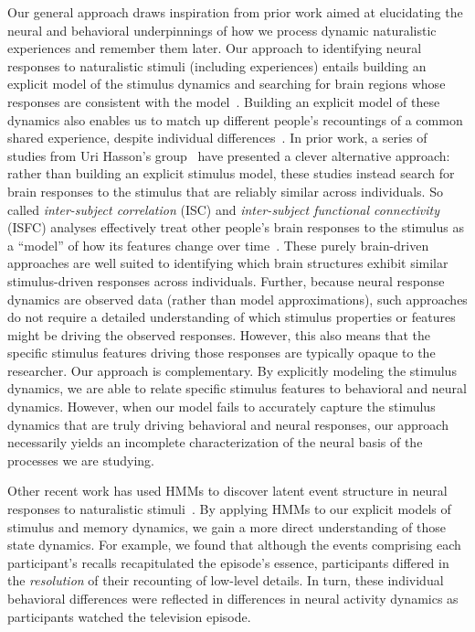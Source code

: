 \documentclass[10pt]{article}
\begin{document}
Our general approach draws inspiration from prior work aimed at elucidating the neural and behavioral underpinnings of how we process dynamic naturalistic experiences and remember them later.  Our approach to identifying neural responses to naturalistic stimuli (including experiences) entails building an explicit model of the stimulus dynamics and searching for brain regions whose responses are consistent with the model~\citep[also see][]{HuthEtal12, HuthEtal16}.  Building an explicit model of these dynamics also enables us to match up different people's recountings of a common shared experience, despite individual differences~\cite[also see][]{GagnEtal20}.  In prior work, a series of studies from Uri Hasson's group~\citep{LernEtal11, SimoEtal16, ChenEtal17, BaldEtal17, ZadbEtal17} have presented a clever alternative approach: rather than building an explicit stimulus model, these studies instead search for brain responses to the stimulus that are reliably similar across individuals.  So called \textit{inter-subject correlation} (ISC) and \textit{inter-subject functional connectivity} (ISFC) analyses effectively treat other people's brain responses to the stimulus as a ``model'' of how its features change over time~\citep[also see][]{SimoChan20}.  These purely brain-driven approaches are well suited to identifying which brain structures exhibit similar stimulus-driven responses across individuals.  Further, because neural response dynamics are observed data (rather than model approximations), such approaches do not require a detailed understanding of which stimulus properties or features might be driving the observed responses.  However, this also means that the specific stimulus features driving those responses are typically opaque to the researcher.  Our approach is complementary.  By explicitly modeling the stimulus dynamics, we are able to relate specific stimulus features to behavioral and neural dynamics.  However, when our model fails to accurately capture the stimulus dynamics that are truly driving behavioral and neural responses, our approach necessarily yields an incomplete characterization of the neural basis of the processes we are studying.

Other recent work has used HMMs to discover latent event structure in neural responses to naturalistic stimuli~\citep{BaldEtal17}.  By applying HMMs to our explicit models of stimulus and memory dynamics, we gain a more direct understanding of those state dynamics.  For example, we found that although the events comprising each participant's recalls recapitulated the episode's essence, participants differed in the \textit{resolution} of their recounting of low-level details.  In turn, these individual behavioral differences were reflected in differences in neural activity dynamics as participants watched the television episode.
\end{document}
